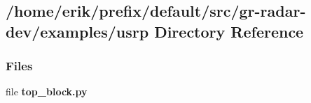 \subsection{/home/erik/prefix/default/src/gr-\/radar-\/dev/examples/usrp Directory Reference}
\label{dir_6fa1a0f95a01ec53f043d0a9c81cdbd8}
\subsubsection*{Files}
\begin{DoxyCompactItemize}
\item 
file {\bf top\+\_\+block.\+py}
\end{DoxyCompactItemize}
